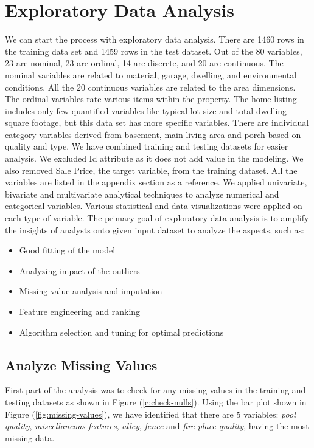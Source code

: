\documentclass[sigconf]{acmart}
\begin{document}
	\section{Exploratory Data Analysis} 
		
	We can start the process with exploratory data analysis. There are 1460 rows in the training data set and 1459 rows in the test dataset. Out of the 80 variables, 23 are nominal, 23 are ordinal, 14 are discrete, and 20 are continuous. The nominal variables are related to material, garage, dwelling, and environmental conditions. All the 20 continuous variables are related to the area dimensions. The ordinal variables rate various items within the property. The home listing includes only few quantified variables like typical lot size and total dwelling square footage, but this data set has more specific variables. There are  individual category variables derived from basement, main living area and porch based on quality and type.  We have combined training and testing datasets for easier analysis. We excluded Id attribute as it does not add value in the modeling. We also removed Sale Price, the target variable, from the training dataset. All the variables are listed in the appendix section as a reference. We applied univariate, bivariate and multivariate analytical techniques to analyze numerical and categorical variables. Various statistical and data visualizations were applied on each type of variable. The primary goal of exploratory data analysis is to amplify the insights of analysts onto given input dataset to analyze the aspects, such as:
	
	\begin{itemize}
		\item Good fitting of the model
		\item Analyzing impact of the outliers
		\item Missing value analysis and imputation
		\item Feature engineering and ranking
		\item Algorithm selection and tuning for optimal predictions
	\end{itemize}
		
	\subsection{Analyze Missing Values}
	
	First part of the analysis was to check for any missing values in the training and testing datasets as shown in Figure (\ref{c:check-nulls}). Using the bar plot shown in Figure (\ref{fig:missing-values}), we have identified that there are 5 variables: {\em pool quality}, {\em miscellaneous features}, {\em alley}, {\em fence} and {\em fire place quality}, having the most missing data. 	
	
\end{document}
